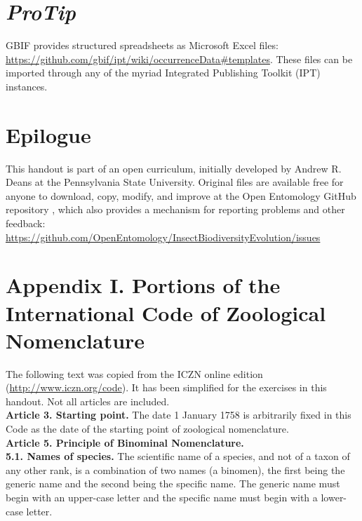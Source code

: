 \documentclass[letterpaper, 11pt]{article}
\begin{document}
\section*{\textit{ProTip}\texttrademark}
GBIF provides structured spreadsheets as Microsoft Excel files: 
\url{https://github.com/gbif/ipt/wiki/occurrenceData#templates}. These files can be imported through any of the myriad Integrated Publishing Toolkit (IPT) instances.

\clearpage
\section*{Epilogue}
This handout is part of an open curriculum, initially developed by Andrew R. Deans at the Pennsylvania State University. Original files are available free for anyone to download, copy, modify, and improve at the Open Entomology GitHub repository \citep{ENT532}, which also provides a mechanism for reporting problems and other feedback:\\
\url{https://github.com/OpenEntomology/InsectBiodiversityEvolution/issues}


\FloatBarrier


\clearpage

\section*{Appendix I. Portions of the International Code of Zoological Nomenclature}
The following text was copied from the ICZN online edition (\url{http://www.iczn.org/code}). It has been simplified for the exercises in this handout. Not all articles are included.\\

\noindent{}\textbf{Article 3. Starting point.} The date 1 January 1758 is arbitrarily fixed in this Code as the date of the starting point of zoological nomenclature.\\

\noindent{}\textbf{Article 5. Principle of Binominal Nomenclature.}\\
\noindent{}\textbf{5.1. Names of species.} The scientific name of a species, and not of a taxon of any other rank, is a combination of two names (a binomen), the first being the generic name and the second being the specific name. The generic name must begin with an upper-case letter and the specific name must begin with a lower-case letter.\\
\end{document}
